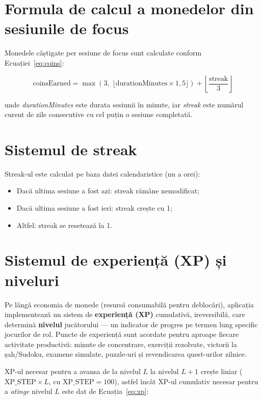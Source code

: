 \documentclass[12pt, a4paper, twoside]{report}
\numberwithin{equation}{section}
\begin{document}
\section{Formula de calcul a monedelor din sesiunile de focus}

Monedele câștigate per sesiune de focus sunt calculate conform Ecuației~\ref{eq:coins}:

\begin{equation}
  \text{coinsEarned} = \max(3,\; \lfloor \text{durationMinutes} \times 1{,}5 \rfloor)
  + \left\lfloor \frac{\text{streak}}{3} \right\rfloor
  \label{eq:coins}
\end{equation}

unde \textit{durationMinutes} este durata sesiunii în minute, iar \textit{streak} este
numărul curent de zile consecutive cu cel puțin o sesiune completată.

\section{Sistemul de streak}

Streak-ul este calculat pe baza datei calendaristice (nu a orei):
\begin{itemize}
  \item Dacă ultima sesiune a fost azi: streak rămâne nemodificat;
  \item Dacă ultima sesiune a fost ieri: streak crește cu 1;
  \item Altfel: streak se resetează la 1.
\end{itemize}

\section{Sistemul de experiență (XP) și niveluri}
\label{sec:xp}

Pe lângă economia de monede (resursă consumabilă pentru deblocări), aplicația implementează
un sistem de \textbf{experiență (XP)} cumulativă, ireversibilă, care determină \textbf{nivelul}
jucătorului — un indicator de progres pe termen lung specific jocurilor de rol. Puncte de
experiență sunt acordate pentru aproape fiecare activitate productivă: minute de concentrare,
exerciții rezolvate, victorii la șah/Sudoku, examene simulate, puzzle-uri și revendicarea
quest-urilor zilnice.

XP-ul necesar pentru a avansa de la nivelul $L$ la nivelul $L+1$ crește liniar
($\text{XP\_STEP} \times L$, cu $\text{XP\_STEP} = 100$), astfel încât XP-ul cumulativ
necesar pentru a \emph{atinge} nivelul $L$ este dat de Ecuația~\ref{eq:xp}:
\end{document}
